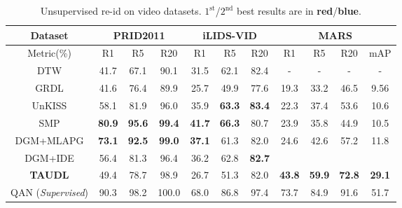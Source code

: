 \documentclass[runningheads]{llncs}
\begin{document}
\begin{table}[h]
	\centering
	\setlength{\tabcolsep}{0.07cm}
	\caption{Unsupervised re-id on video datasets.
		$1^\text{st}$/$2^\text{nd}$ best results are in \textbf{\color{red}red}/\textbf{\color{blue}blue}.
	}
	\label{tab:vide_SOTA}
	\begin{tabular}
		{c||c|c|c||c|c|c||c|c|c|c}
		\hline
		Dataset		    						
		& \multicolumn{3}{c||}{PRID2011 \cite{hirzer2011person}}      	
		& \multicolumn{3}{c||}{iLIDS-VID \cite{wang2014person}}		
		& \multicolumn{4}{c}{MARS \cite{zheng2016mars}} 										
		\\ \hline\hline
		Metric(\%) 							
		& R1 	& R5 	& R20 				
		& R1 	& R5 	& R20 		 		
		& R1 	& R5	& R20 			& mAP
		\\ \hline \hline
		DTW \cite{ma2017person}            		
		& 41.7   & 67.1   & 90.1		& 31.5   & 62.1   & 82.4	    	 & -      	& - 		& -       	& -
		\\
		GRDL \cite{kodirov2016person}		
		& 41.6	& 76.4	& 89.9				& 25.7	& 49.9	& 77.6				& 19.3			& 33.2			& 46.5			& 9.56			\\
		UnKISS \cite{khan2016unsupervised}	
		& 58.1	& 81.9	& 96.0				
		& 35.9	&\color{blue} \bf 63.3	& \color{red} \bf 83.4				
		& 22.3	& 37.4	& 53.6	& 10.6
		\\ 
		SMP \cite{liu2017stepwise}            		
		& \color{red} \bf 80.9   & \color{red} \bf 95.6   & \color{red} \bf99.4				
		& \color{red} \bf 41.7   & \color{red} \bf 66.3   & 80.7	    	 		
		& 23.9   				  & 35.8				    & 44.9			& 10.5
		\\ 
		DGM+MLAPG \cite{ye2017dynamic}     
		&\color{blue} \bf  73.1   				  
		&\color{blue} \bf  92.5   	
		&\color{blue} \bf  99.0
		&\color{blue} \bf 37.1   & 61.3  	& 82.0
		& 24.6   				  & 42.6		& 57.2			& 11.8 			\\ 
		DGM+IDE \cite{ye2017dynamic}         	
		&56.4   & 81.3  &96.4
		& 36.2   				  & 62.8   			    & \color{blue} \bf82.7
		& \textbf{\color{blue}{36.8}}   & \textbf{\color{blue}{54.0}}   & \textbf{\color{blue}{68.5}}   & \textbf{\color{blue}{21.3}}
		\\ 
		\hline
		\textbf{TAUDL} 
		& 49.4 	& 78.7	& 98.9
		& 26.7   & 51.3	& 82.0 
		& \textbf{\color{red}43.8}	& \textbf{\color{red}59.9}	& \textbf{\color{red}72.8}	& \textbf{\color{red}29.1} 
		\\ \hline
		{QAN \cite{liu2017quality}({\em Supervised})}
		& 90.3	& 98.2   & 100.0		& 68.0	& 86.8 	& 97.4 		& 73.7	& 84.9 	& 91.6 	& 51.7
		\\ \hline
	\end{tabular}
\end{table}
\end{document}
